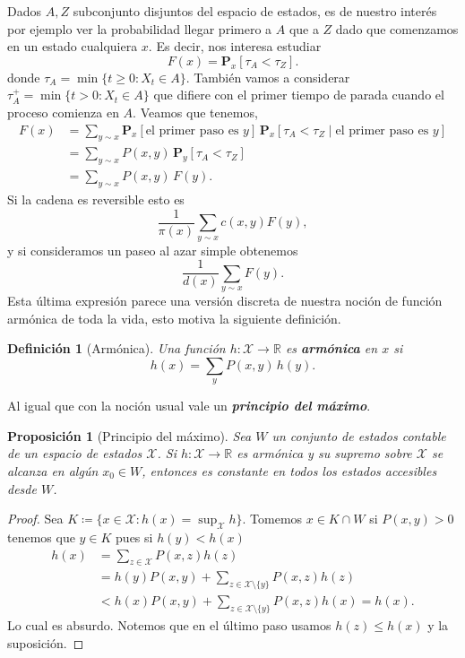 \documentclass[11pt,a4paper]{article}
\newcommand{\R}{\mathbb{R}}
\newcommand{\Prob}{\textbf{P}}
\newcommand{\defeq}{\coloneqq}                           %
\newcommand{\defn}[1]{\textbf{\emph{#1}}}
\numberwithin{equation}{section}
\theoremstyle{LPplain}
\newtheorem{prop}[teo]{Proposición}
\theoremstyle{LPdef}
\newtheorem{defi}[teo]{Definición}
\theoremstyle{LPrem}
\begin{document}
Dados $A, Z$ subconjunto disjuntos del espacio de estados, es de nuestro interés por ejemplo
ver la probabilidad llegar primero a $A$ que a $Z$ dado que comenzamos en un estado cualquiera $x$.
Es decir, nos interesa estudiar
$$F(x) = \Prob_x[\tau_A < \tau_Z].$$
donde $\tau_A = \min\{t \geq 0 \colon X_t \in A\}$. También vamos a considerar 
$\tau_{A}^{+} = \min\{t > 0 \colon X_t \in A\}$ que difiere con el primer tiempo de parada cuando
el proceso comienza en $A$. Veamos que tenemos,
\begin{align*}
  F(x) &= \sum_{y \sim x} \Prob_x[\text{el primer paso es } y]\,
          \Prob_x[\tau_A < \tau_Z \mid \text{el primer paso es } y] \\
       &= \sum_{y \sim x} P(x,y)\, \Prob_y[\tau_A < \tau_Z] \\
       &= \sum_{y \sim x} P(x,y)\, F(y).
\end{align*}
Si la cadena es reversible esto es 
$$ \frac{1}{\pi(x)} \sum_{y \sim x} c(x, y) F(y),$$
y si consideramos un paseo al azar simple obtenemos
$$ \frac{1}{d(x)} \sum_{y \sim x} F(y).$$
Esta última expresión parece una versión discreta de nuestra noción 
de función armónica de toda la vida, esto motiva la siguiente definición.

\begin{defi}[Armónica]
Una función $h \colon \mathcal{X} \to \R$ es \defn{armónica} en $x$ si
$$  h(x) = \sum_{y} P(x,y)\,h(y). $$
\end{defi}

Al igual que con la noción usual vale un \defn{principio del máximo}.

\begin{prop}[Principio del máximo]
  Sea $W$ un conjunto de estados contable de un espacio de estados $\mathcal{X}$.
  Si $h : \mathcal{X} \to \R$ es armónica y su supremo sobre $\mathcal{X}$ se alcanza en algún
  $x_0 \in W$, entonces es constante en todos los estados accesibles desde $W$.
\end{prop}

\begin{proof}
  Sea $K \defeq \{x \in \mathcal{X} \colon h(x) = \sup_{\mathcal{X}}{h} \}$. 
  Tomemos $x \in K \cap W$ si $P(x, y) > 0$ tenemos que $y \in K$ pues si $h(y) < h(x)$ 
  \begin{align*}
    h(x) &= \sum_{z \in \mathcal{X}} P(x, z) h(z) \\ 
         &= h(y) P(x,y) + \sum_{z \in \mathcal{X} \setminus \{y\}} P(x, z) h(z) \\
         &< h(x) P(x,y) + \sum_{z \in \mathcal{X} \setminus \{y\}} P(x, z) h(x) = h(x).
  \end{align*}
  Lo cual es absurdo. Notemos que en el último paso usamos $h(z) \leq h(x)$ y la suposición. 
\end{proof}
\end{document}
